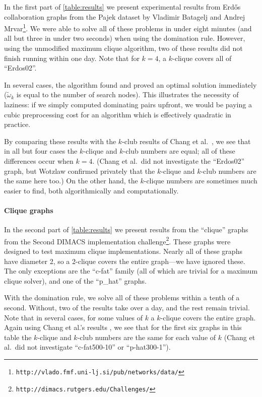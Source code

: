 \documentclass[letterpaper]{article}
\begin{document}
In the first part of \cref{table:results} we present experimental results from Erd\H{o}s
collaboration graphs from the Pajek dataset by Vladimir Batagelj and Andrej
Mrvar\footnote{\texttt{http://vlado.fmf.uni-lj.si/pub/networks/data/}}.  We were able to solve all of
these problems in under eight minutes (and all but three in under two seconds) when using the
domination rule. However, using the unmodified maximum clique algorithm, two of these results did
not finish running within one day. Note that for $k = 4$, a $k$-clique covers all of ``Erdos02''.

In several cases, the algorithm found and proved an optimal solution immediately ($\tilde{\omega}_k$
is equal to the number of search nodes). This illustrates the necessity of laziness: if we simply
computed dominating pairs upfront, we would be paying a cubic preprocessing cost for an algorithm
which is effectively quadratic in practice.

By comparing these results with the $k$-club results of Chang et al.\ \cite{Chang:2013}, we see that
in all but four cases the $k$-clique and $k$-club numbers are equal; all of these differences occur
when $k = 4$. (Chang et al.\ did not investigate the ``Erdos02'' graph, but Wotzlaw
\cite{Wotzlaw:2014} confirmed privately that the $k$-clique and $k$-club numbers are the same here
too.) On the other hand, the $k$-clique numbers are sometimes much easier to find, both
algorithmically and computationally.

\paragraph{Clique graphs}

In the second part of \cref{table:results} we present results from the ``clique'' graphs from the
Second DIMACS implementation challenge\footnote{\texttt{http://dimacs.rutgers.edu/Challenges/}}. These
graphs were designed to test maximum clique implementations. Nearly all of these graphs have
diameter 2, so a 2-clique covers the entire graph---we have ignored these. The only exceptions are
the ``c-fat'' family (all of which are trivial for a maximum clique solver), and one of the
``p\_hat'' graphs.

With the domination rule, we solve all of these problems within a tenth of a second. Without, two of
the results take over a day, and the rest remain trivial. Note that in several cases, for some
values of $k$ a $k$-clique covers the entire graph.  Again using Chang et al.'s results
\cite{Chang:2013}, we see that for the first six graphs in this table the $k$-clique and $k$-club
numbers are the same for each value of $k$ (Chang et al.\ did not investigate ``c-fat500-10'' or
``p-hat300-1'').
\end{document}
